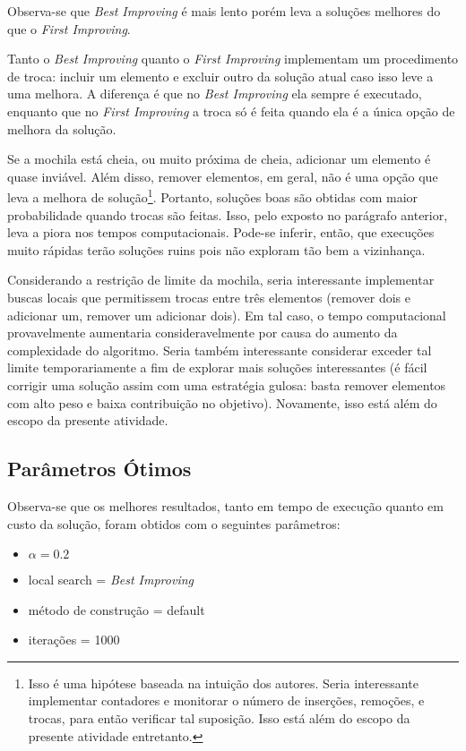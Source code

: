 \documentclass{article}
\theoremstyle{definition}
\newcommand{\firstImproving}{\textit{First Improving}\xspace}
\newcommand{\bestImproving}{\textit{Best Improving}\xspace}
\begin{document}
Observa-se que \bestImproving é mais lento porém leva a soluções melhores do que o \firstImproving.

Tanto o \bestImproving quanto o \firstImproving implementam um procedimento de troca: incluir um elemento e excluir outro da solução atual caso isso leve a uma melhora. A diferença é que no \bestImproving ela sempre é executado, enquanto que no \firstImproving a troca só é feita quando ela é a única opção de melhora da solução.

Se a mochila está cheia, ou muito próxima de cheia, adicionar um elemento é quase inviável. Além disso, remover elementos, em geral, não é uma opção que leva a melhora de solução\footnote{Isso é uma hipótese baseada na intuição dos autores. Seria interessante implementar contadores e monitorar o número de inserções, remoções, e trocas, para então verificar tal suposição. Isso está além do escopo da presente atividade entretanto.}. Portanto, soluções boas são obtidas com maior probabilidade quando trocas são feitas. Isso, pelo exposto no parágrafo anterior, leva a piora nos tempos computacionais. Pode-se inferir, então, que execuções muito rápidas terão soluções ruins pois não exploram tão bem a vizinhança.

Considerando a restrição de limite da mochila, seria interessante implementar buscas locais que permitissem trocas entre três elementos (remover dois e adicionar um, remover um adicionar dois). Em tal caso, o tempo computacional provavelmente aumentaria consideravelmente por causa do aumento da complexidade do algoritmo. Seria também interessante considerar exceder tal limite temporariamente a fim de explorar mais soluções interessantes (é fácil corrigir uma solução assim com uma estratégia gulosa: basta remover elementos com alto peso e baixa contribuição no objetivo). Novamente, isso está além do escopo da presente atividade.

\subsection{Parâmetros Ótimos}

Observa-se que os melhores resultados, tanto em tempo de execução quanto em custo da solução, foram obtidos com o seguintes parâmetros:

\begin{itemize}
    \item $\alpha = 0.2$
    \item local search = \bestImproving
    \item método de construção = default
    \item iterações = 1000
\end{itemize}
\end{document}
